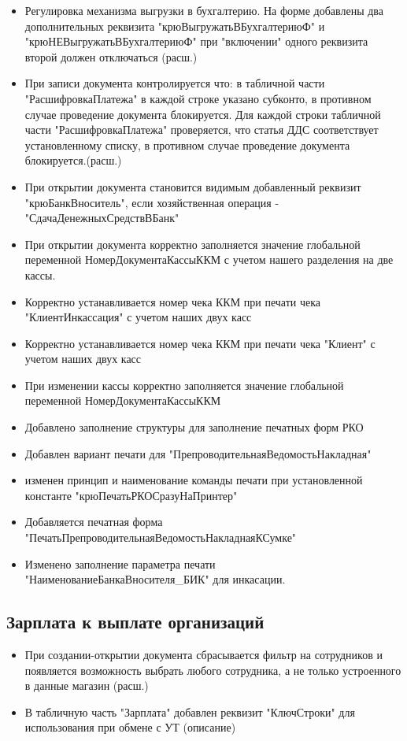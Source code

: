 \begin{itemize}
	\item  Регулировка механизма выгрузки в бухгалтерию. На форме добавлены два дополнительных реквизита "крюВыгружатьВБухгалтериюФ" и "крюНЕВыгружатьВБухгалтериюФ" при "включении" одного реквизита второй должен отключаться
	(расш.)
	\item При записи документа контролируется что: в табличной части "РасшифровкаПлатежа" в каждой строке указано субконто, в противном случае проведение документа блокируется. Для каждой строки табличной части "РасшифровкаПлатежа" проверяется, что статья ДДС соответствует установленному списку, в противном случае проведение документа блокируется.(расш.)
	\item При открытии документа становится видимым добавленный реквизит "крюБанкВноситель", если хозяйственная операция - "СдачаДенежныхСредствВБанк"
	\item При открытии документа корректно заполняется значение глобальной переменной НомерДокументаКассыККМ
	с учетом нашего разделения на две кассы. 
	\item Корректно устанавливается номер чека ККМ при печати чека "КлиентИнкассация"  с учетом наших двух касс
	\item Корректно устанавливается номер чека ККМ при печати чека "Клиент"  с учетом наших двух касс
	\item При изменении кассы корректно заполняется значение глобальной переменной НомерДокументаКассыККМ
	\item Добавлено заполнение структуры для заполнение печатных форм РКО
	\item Добавлен вариант печати для "ПрепроводительнаяВедомостьНакладная"
	\item изменен принцип и наименование команды печати при установленной константе "крюПечатьРКОСразуНаПринтер"
	\item Добавляется печатная форма "ПечатьПрепроводительнаяВедомостьНакладнаяКСумке"
	\item Изменено заполнение параметра печати "НаименованиеБанкаВносителя\_БИК" для инкасации.


\end{itemize}



\subsection{Зарплата к выплате организаций}
\begin{itemize}
     \item При создании-открытии документа сбрасывается фильтр на сотрудников и появляется возможность выбрать любого сотрудника, а не только устроенного в данные магазин (расш.)
	 \item В табличную часть "Зарплата" добавлен реквизит "КлючСтроки" для использования при обмене с УТ
	 	(описание)

\end{itemize}

